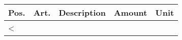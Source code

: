 \renewcommand{\arraystretch}{1.2} %

\begin{tabularx}{\textwidth}{@{}llXrr@{}}

\hline

\textbf{Pos.} & \textbf{Art.} & \textbf{Description} & \textbf{Amount} & \textbf{Unit} \\

\hline

<%
\IfSubStr{<%
\ifthenelse{\equal{<%
\ifthenelse{\equal{<%
\ifthenelse{\equal{<%
\ifthenelse{\equal{<%
\ifthenelse{\equal{<%
\ifthenelse{\equal{<%
\ifthenelse{\equal{<%
\ifthenelse{\equal{<%
& \IfSubStr{<%
<%
\end{tabularx}
\hline